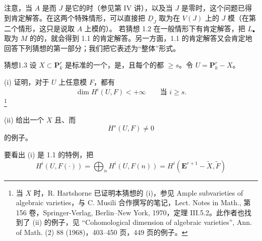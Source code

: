 注意，当 $A$ 是而 $J$ 是它的时（参见第 IV 讲），以及当 $J$ 是零时，这个问题已得到肯定解答。在这两个特殊情形，可以直接把 $\underline D_J$ 取为在 $V(J)$ 上的 $J$ 模（在第二个情形，这只是说取 $A$ 上模的）。
若猜想 1.2 在一般情形下有肯定解答，把 $L_\bullet$ 取为 $M$ 的的，就会得到 1.1 的肯定解答。另一方面，1.1 的肯定解答又会肯定地回答下列猜想的第一部分；我们把它表述为“整体”形式。

\begin{SGAresult}{猜想}{1.3}
设 $X\subset\mathbf P^r_k$ 是标准的一个，是，且每个的都 $\geq s$。令 $U=\mathbf P^r_k-X$。

(i) 证明，对于 $U$ 上任意模 $F$，都有
\[
\dim H^i(U,F)<+\infty\qquad\text{当 }i\geq s.
\]
\footnote{当 $X$ 时，R. Hartshorne 已证明本猜想的 (i)，参见 Ample subvarieties of algebraic varieties，与 C. Musili 合作撰写的笔记，Lect. Notes in Math., 第 156 卷，Springer-Verlag, Berlin--New York, 1970，定理 III.5.2。此作者也找到了 (ii) 的例子，见 “Cohomological dimension of algebraic varieties”, Ann. of Math. (2) 88 (1968)，403--450 页，449 页的例子。}

(ii) 给出一个 $X$ 且、而
\[
H^s(U,F)\ne0
\]
的例子。
\end{SGAresult}
要看出 (i) 是 1.1 的特例，把
\[
H^i(U,F(\mathord\cdot))=\bigoplus_n H^i(U,F(n))
 =H^i(\mathbf E^{r+1}-\widetilde X,\widetilde F)
\]
